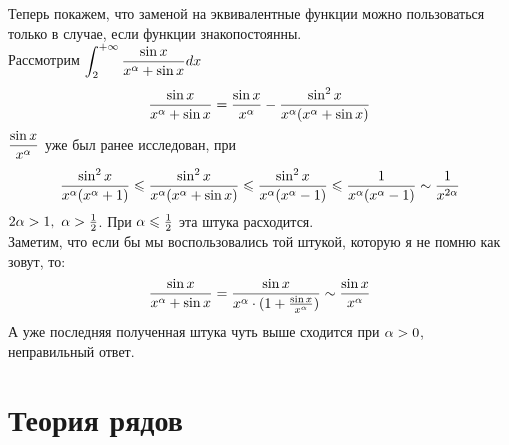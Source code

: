 \begin{example}
	Теперь покажем, что заменой на эквивалентные функции можно пользоваться только в случае, если функции знакопостоянны.\\
	Рассмотрим $\displaystyle\int_2^{+\infty} \frac{\sin x}{x^\alpha+\sin x}dx$
	\[\frac{\sin x}{x^\alpha+\sin x}=\frac{\sin x}{x^\alpha}-\frac{\sin^2x}{x^\alpha(x^\alpha+\sin x)}\]
	$\displaystyle\frac{\sin x}{x^\alpha}$ уже был ранее исследован, при 
	\[\frac{\sin^2x}{x^\alpha(x^\alpha+1)}\leqslant\frac{\sin^2x}{x^\alpha(x^\alpha+\sin x)}\leqslant\frac{\sin^2x}{x^\alpha(x^\alpha-1)}\leqslant\frac1{x^\alpha(x^\alpha-1)}\sim\frac1{x^{2\alpha}}\]
	$2\alpha>1,\ \alpha>\frac12$. При $\alpha\leqslant\frac12$ эта штука расходится.\\
	Заметим, что если бы мы воспользовались той штукой, которую я не помню как зовут, то:
	\[\frac{\sin x}{x^\alpha+\sin x}=\frac{\sin x}{x^\alpha\cdot(1+\frac{\sin x}{x^\alpha})}\sim\frac{\sin x}{x^\alpha}\]
	А уже последняя полученная штука чуть выше сходится при $\alpha>0$, неправильный ответ.
\end{example}
\section{Теория рядов}
